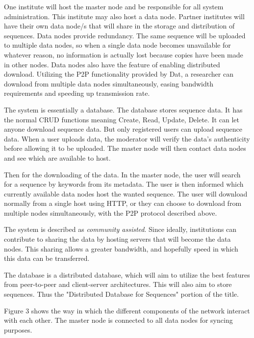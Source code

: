 \documentclass[acmsmall]{acmart}
\begin{document}
\begin{multicols}{2}
One institute will host the master node and be responsible for all system administration. This institute may also host a data node. Partner institutes will have their own data node/s that will share in the storage and distribution of sequences. Data nodes provide redundancy. The same sequence will be uploaded to multiple data nodes, so when a single data node becomes unavailable for whatever reason, no information is actually lost because copies have been made in other nodes. Data nodes also have the feature of enabling distributed download. Utilizing the P2P functionality provided by Dat, a researcher can download from multiple data nodes simultaneously, easing bandwidth requirements and speeding up transmission rate.

The system is essentially a database. The database stores sequence data. It has the normal CRUD functions meaning Create, Read, Update, Delete. It can let anyone download sequence data. But only registered users can upload sequence data. When a user uploads data, the moderator will verify the data's authenticity before allowing it to be uploaded. The master node will then contact data nodes and see which are available to host. 

Then for the downloading of the data. In the master node, the user will search for a sequence by keywords from its metadata. The user is then informed which currently available data nodes host the wanted sequence. The user will download normally from a single host using HTTP, or they can choose to download from multiple nodes simultaneously, with the P2P protocol described above.


The system is described as \textit{community assisted}. Since ideally, institutions can contribute to sharing the data by hosting servers that will become the data nodes. This sharing allows a greater bandwidth, and hopefully speed in which this data can be transferred. 

The database is a distributed database, which will aim to utilize the best features from peer-to-peer and client-server architectures. This will also aim to store sequences. Thus the "Distributed Database for Sequences" portion of the title.

Figure 3 shows the way in which the different components of the network interact with each other. The master node is connected to all data nodes for syncing purposes. 


\end{multicols}
\end{document}
